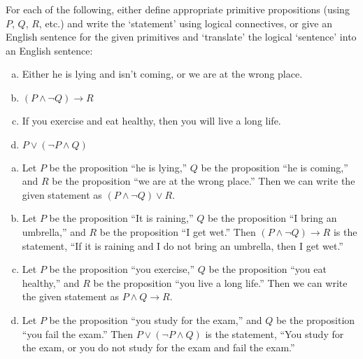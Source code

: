 \documentclass[11pt,letterpaper]{article}
\begin{document}
\newpage



 For each of the following, either define appropriate primitive propositions (using $P$, $Q$, $R$, etc.) and write the `statement' using logical connectives, or give an English sentence for the given primitives and `translate' the logical `sentence' into an English sentence:
	\begin{enumerate}[(a)]
	\item Either he is lying and isn't coming, or we are at the wrong place. 
	\item $(P \wedge \neg Q) \to R$
	\item If you exercise and eat healthy, then you will live a long life.
	\item $P \vee (\neg P \wedge Q)$
	\end{enumerate} \pspace

\begin{enumerate}[(a)]
\item Let $P$ be the proposition ``he is lying,'' $Q$ be the proposition ``he is coming,'' and $R$ be the proposition ``we are at the wrong place.'' Then we can write the given statement as $(P \wedge \neg Q) \vee R$. \pspace

\item Let $P$ be the proposition ``It is raining,'' $Q$ be the proposition ``I bring an umbrella,'' and $R$ be the proposition ``I get wet.'' Then $(P \wedge \neg Q) \to R$ is the statement, ``If it is raining and I do not bring an umbrella, then I get wet.'' \pspace

\item Let $P$ be the proposition ``you exercise,'' $Q$ be the proposition ``you eat healthy,'' and $R$ be the proposition ``you live a long life.'' Then we can write the given statement as $P \wedge Q \to R$. \pspace

\item Let $P$ be the proposition ``you study for the exam,'' and $Q$ be the proposition ``you fail the exam.'' Then $P \vee (\neg P \wedge Q)$ is the statement, ``You study for the exam, or you do not study for the exam and fail the exam.'' 
\end{enumerate}



\newpage
\end{document}
